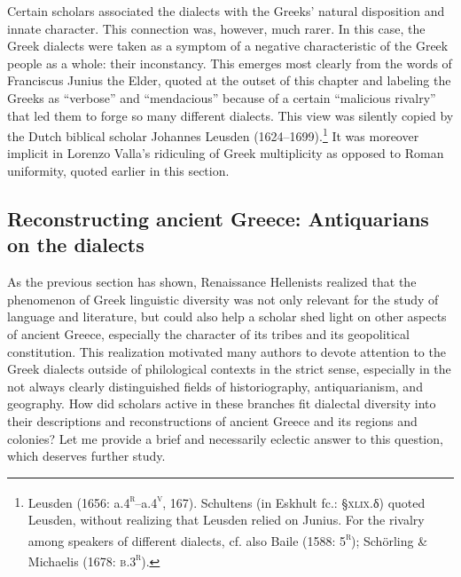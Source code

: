 \documentclass[output=paper]{langsci/langscibook}
\begin{document}
Certain scholars associated the dialects with the Greeks’ natural disposition and innate character. This connection was, however, much rarer. In this case, the Greek dialects were taken as a symptom of a negative characteristic of the Greek people as a whole: their inconstancy. This emerges most clearly from the words of Franciscus Junius the Elder, quoted at the outset of this chapter and labeling the Greeks as “verbose” and “mendacious” because of a certain “malicious rivalry” that led them to forge so many different dialects. This view was silently copied by the Dutch biblical scholar Johannes Leusden (1624–1699).\footnote{Leusden (1656: a.4\textsc{\textsuperscript{r}}\textsc{–}a.4\textsc{\textsuperscript{v}}, 167). Schultens (in Eskhult fc.: §\textsc{xlix.}δ) quoted Leusden, without realizing that Leusden relied on Junius. For the rivalry among speakers of different dialects, cf. also Baile (1588: 5\textsc{\textsuperscript{r}}); Schörling \& Michaelis (1678: \textsc{b.3}\textsc{\textsuperscript{r}}).} It was moreover implicit in Lorenzo Valla’s ridiculing of Greek multiplicity as opposed to Roman uniformity, quoted earlier in this section.

\subsection{Reconstructing ancient Greece: Antiquarians on the dialects}
\hypertarget{Toc19704855}{}
As the previous section has shown, Renaissance Hellenists realized that the phenomenon of Greek linguistic diversity was not only relevant for the study of language and literature, but could also help a scholar shed light on other aspects of ancient Greece, especially the character of its tribes and its geopolitical constitution. This realization motivated many authors to devote attention to the Greek dialects outside of philological contexts in the strict sense, especially in the not always clearly distinguished fields of historiography, antiquarianism, and geography. How did scholars active in these branches fit dialectal diversity into their descriptions and reconstructions of ancient Greece and its regions and colonies? Let me provide a brief and necessarily eclectic answer to this question, which deserves further study.
\end{document}
